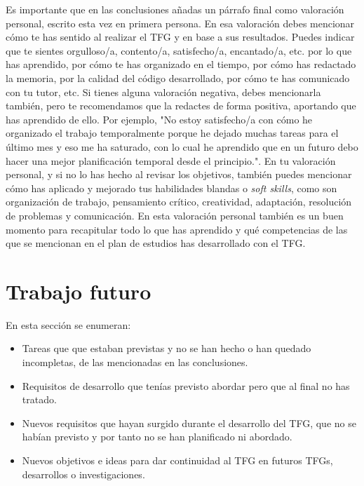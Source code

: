 Es importante que en las conclusiones añadas un párrafo final como valoración personal, escrito esta vez en primera persona. En esa valoración debes mencionar cómo te has sentido al realizar el TFG y en base a sus resultados. Puedes indicar que te sientes orgulloso/a, contento/a, satisfecho/a, encantado/a, etc. por lo que has aprendido, por cómo te has organizado en el tiempo, por cómo has redactado la memoria, por la calidad del código desarrollado, por cómo te has comunicado con tu tutor, etc. Si tienes alguna valoración negativa, debes mencionarla también, pero te recomendamos que la redactes de forma positiva, aportando que has aprendido de ello. Por ejemplo, "No estoy satisfecho/a con cómo he organizado el trabajo temporalmente porque he dejado muchas tareas para el último mes y eso me ha saturado, con lo cual he aprendido que en un futuro debo hacer una mejor planificación temporal desde el principio.". En tu valoración personal, y si no lo has hecho al revisar los objetivos, también puedes mencionar cómo has aplicado y mejorado tus habilidades blandas o \textit{soft skills}, como son organización de trabajo, pensamiento crítico, creatividad, adaptación, resolución de problemas y comunicación. En esta valoración personal también es un buen momento para recapitular todo lo que has aprendido y qué competencias de las que se mencionan en el plan de estudios has desarrollado con el TFG.

 \section{Trabajo futuro}

 En esta sección se enumeran:
 \begin{itemize}
     \item Tareas que que estaban previstas y no se han hecho o han quedado incompletas, de las mencionadas en las conclusiones.
     \item Requisitos de desarrollo que tenías previsto abordar pero que al final no has tratado.
     \item Nuevos requisitos que hayan surgido durante el desarrollo del TFG, que no se habían previsto y por tanto no se han planificado ni abordado.
     \item Nuevos objetivos e ideas para dar continuidad al TFG en futuros TFGs, desarrollos o investigaciones.
 \end{itemize} 

